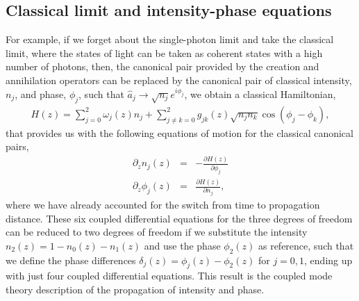 \documentclass[9pt,twocolumn,twoside]{osajnl}
\begin{document}
\subsection{Classical limit and intensity-phase equations}
For example, if we forget about the single-photon limit and take the classical limit, where the states of light can be taken as coherent states with a high number of photons, then, the canonical pair provided by the creation and annihilation operators can be replaced by the canonical pair of classical intensity, $n_{j}$, and phase, $\phi_{j}$, such that $\hat{a}_{j} \rightarrow \sqrt{n_{j}} e^{i \phi_{j}}$, we obtain a classical Hamiltonian, 
\begin{eqnarray}\label{eq:clHamiltonian}
	H(z) = \sum_{j=0}^{2} \omega_{j}(z) n_{j}  
	+ \sum_{j \neq k = 0}^{2} g_{jk}(z) \sqrt{n_{j} n_{k}} \cos \left( \phi_{j} - \phi_{k} \right),
\end{eqnarray}
that provides us with the following equations of motion for the classical canonical pairs, 
\begin{eqnarray}
	\partial_z n_j(z) &=& -\frac{\partial H(z)}{\partial \phi_j}\\
	\partial_z \phi_j(z) &=& \frac{\partial H(z)}{\partial n_j},
\end{eqnarray}
where we have already accounted for the switch from time to propagation distance.
These six coupled differential equations for the three degrees of freedom can be reduced to two degrees of freedom if we substitute the intensity $n_{2}(z) = 1 - n_{0}(z)- n_{1}(z)$ and use the phase $\phi_{2}(z)$ as reference, such that we define the phase differences $\delta_{j}(z) = \phi_{j}(z) - \phi_{2}(z)$ for $j=0,1$, ending up with just four coupled differential equations.
This result is the coupled mode theory description of the propagation of intensity and phase.
\end{document}
